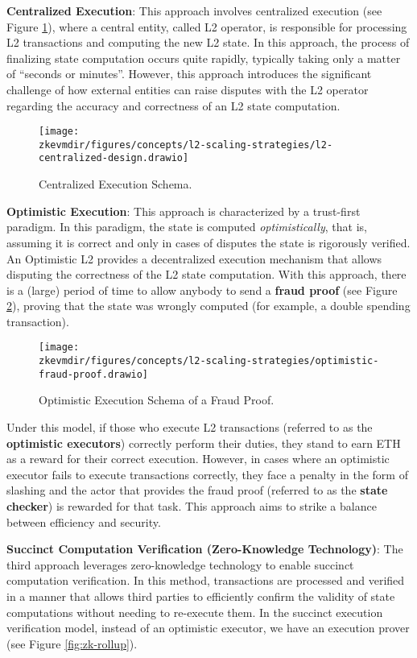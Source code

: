 \textbf{Centralized Execution}: This approach involves centralized execution (see Figure \ref{fig:centralized-execution}), where a central entity, called L2 operator, is responsible for processing L2 transactions and computing the new L2 state. In this approach, the process of finalizing state computation occurs quite rapidly, typically taking only a matter of ``seconds or minutes''. However, this approach introduces the significant challenge of how external entities can raise disputes with the L2 operator regarding the accuracy and correctness of an L2 state computation.
\begin{figure}[h!]
\centering
\texttt{[image: \\zkevmdir/figures/concepts/l2-scaling-strategies/l2-centralized-design.drawio]}
\caption{Centralized Execution Schema.}
\label{fig:centralized-execution}
\end{figure}
\textbf{Optimistic Execution}: This approach is characterized by a trust-first paradigm. In this paradigm, the state is computed \textit{optimistically}, that is, assuming it is correct and only in cases of disputes the state is rigorously verified. An Optimistic L2 provides a decentralized execution mechanism that allows disputing the correctness of the L2 state computation. With this approach, there is a (large) period of time to allow anybody to send a \textbf{fraud proof} (see Figure \ref{fig:optimistic-execution}), proving that the state was wrongly computed (for example, a double spending transaction). 
\begin{figure}[h!]
\centering
\texttt{[image: \\zkevmdir/figures/concepts/l2-scaling-strategies/optimistic-fraud-proof.drawio]}
\caption{Optimistic Execution Schema of a Fraud Proof.}
\label{fig:optimistic-execution}
\end{figure}
Under this model, if those who execute L2 transactions (referred to as the \textbf{optimistic executors}) correctly perform their duties, they stand to earn ETH as a reward for their correct execution. However, in cases where an optimistic executor fails to execute transactions correctly, they face a penalty in the form of slashing and the actor that provides the fraud proof (referred to as the \textbf{state checker}) is rewarded for that task. This approach aims to strike a balance between efficiency and security.

\textbf{Succinct Computation Verification (Zero-Knowledge Technology)}: The third approach leverages zero-knowledge technology to enable succinct computation verification. In this method, transactions are processed and verified in a manner that allows third parties to efficiently confirm the validity of state computations without needing to re-execute them. In the succinct execution verification model, instead of an optimistic executor, we have an
execution prover (see Figure \ref{fig:zk-rollup}).

